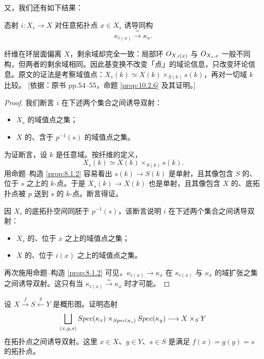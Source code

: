 又，我们还有如下结果：

\begin{proposition}\label{prop:10.2.6}
态射 $i \colon X_s \to X$ 对任意拓扑点 $x \in X_s$ 诱导同构
\[
\kappa_{i(x)} \xrightarrow{\ \simeq\ } \kappa_x .
\]
\end{proposition}

\begin{yizhu}
纤维在环层面偏离 $X$，剩余域却完全一致：局部环 $O_{X,i(x)}$ 与 $O_{X_s,x}$ 一般不同构，但两者的剩余域相同。因此基变换不改变「点」的域论信息，只改变环论信息。原文的证法是考察域值点：$X_s(k) \simeq X(k) \times_{S(k)} s(k)$，再对一切域 $k$ 比较。
[依据：原书 pp.54--55，命题 \ref{prop:10.2.6} 及其证明。]
\end{yizhu}

\begin{proof}
我们断言 $i$ 在下述两个集合之间诱导双射：
\begin{itemize}[leftmargin=2em,itemsep=0.25ex]
  \item $X_s$ 的域值点之集；
  \item $X$ 的、含于 $p^{-1}(s)$ 的域值点之集。
\end{itemize}
为证断言，设 $k$ 是任意域。按纤维的定义，
\[
X_s(k) \simeq X(k) \times_{S(k)} s(k).
\]
用命题–构造 \ref{prop:8.1.2} 容易看出 $s(k) \to S(k)$ 是单射，且其像包含 $S$ 的、位于 $s$ 之上的 $k$-点。于是 $X_s(k) \to X(k)$ 也是单射，且其像包含 $X$ 的、底拓扑点被 $p$ 送到 $s$ 的 $k$-点。断言得证。

因 $X_s$ 的底拓扑空间同胚于 $p^{-1}(s)$，该断言说明 $i$ 在下述两个集合之间诱导双射：
\begin{itemize}[leftmargin=2em,itemsep=0.25ex]
  \item $X_s$ 的、位于 $x$ 之上的域值点之集；
  \item $X$ 的、位于 $i(x)$ 之上的域值点之集。
\end{itemize}
再次施用命题–构造 \ref{prop:8.1.2} 可见，$\kappa_{i(x)} \to \kappa_x$ 在 $\kappa_{i(x)}$ 与 $\kappa_x$ 的域扩张之集之间诱导双射。这只有当 $\kappa_{i(x)} \xrightarrow{\simeq} \kappa_x$ 时才可能。
\end{proof}

\begin{exercise}\label{exc:10.2.7}
设 $X \xrightarrow{f} S \xleftarrow{g} Y$ 是概形图。证明态射
\[
\bigsqcup_{(x,y,s)} Spec(\kappa_x) \times_{Spec(\kappa_s)} Spec(\kappa_y) \longrightarrow X \times_S Y
\]
在拓扑点之间诱导双射。这里 $x \in X$、$y \in Y$、$s \in S$ 是满足 $f(x) = g(y) = s$ 的拓扑点。
\end{exercise}

